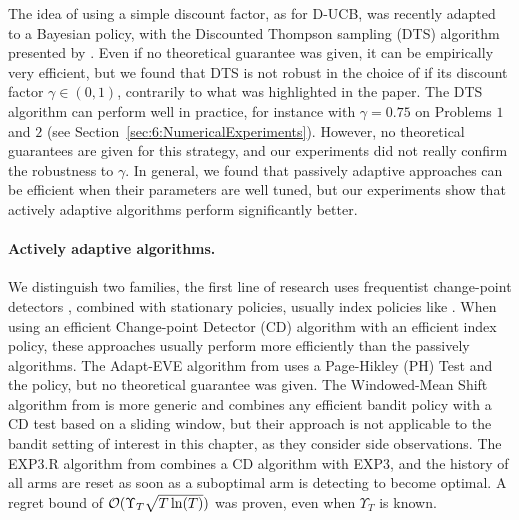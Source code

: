 The idea of using a simple discount factor, as for D-UCB, was recently adapted to a Bayesian policy, with the Discounted Thompson sampling (DTS) algorithm presented by \cite{RajKalyani17}.
Even if no theoretical guarantee was given, it can be empirically very efficient, but we found that DTS is not robust in the choice of if its discount factor $\gamma\in(0,1)$, contrarily to what was highlighted in the paper.
The DTS algorithm can perform well in practice, for instance with $\gamma=0.75$ on Problems $1$ and $2$ (see Section~\ref{sec:6:NumericalExperiments}). However, no theoretical guarantees are given for this strategy, and our experiments did not really confirm the robustness to $\gamma$.
%
In general, we found that passively adaptive approaches can be efficient when their parameters are well tuned, but our experiments show that actively adaptive algorithms perform significantly better.




\paragraph{Actively adaptive algorithms.}
%
We distinguish two families,
the first line of research uses frequentist change-point detectors \cite{Basseville93}, combined with stationary policies, usually index policies like \UCB.
When using an efficient Change-point Detector (CD) algorithm with an efficient index policy, these approaches usually perform more efficiently than the passively algorithms.
%
The Adapt-EVE algorithm from \cite{Hartland06} uses a Page-Hikley (PH) Test and the \UCB{} policy, but no theoretical guarantee was given.
%
The Windowed-Mean Shift algorithm from \cite{YuMannor09} is more generic and combines any efficient bandit policy with a CD test based on a sliding window, but their approach is not applicable to the bandit setting of interest in this chapter, as they consider side observations.
%
The EXP3.R algorithm from \cite{Allesiardo15,Allesiardo17} combines a CD algorithm with EXP3, and the history of all arms are reset as soon as a suboptimal arm is detecting to become optimal.
A regret bound of $\mathcal{O}(\Upsilon_T \sqrt{T \ln(T)})$ was proven, even when $\Upsilon_T$ is known.

